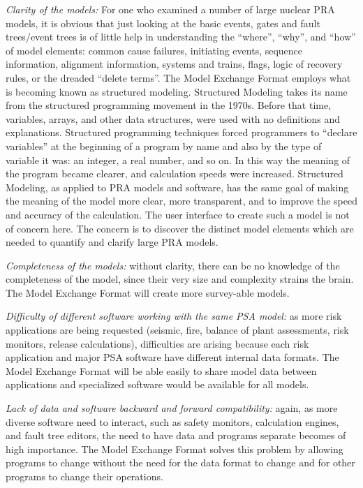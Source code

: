 \documentclass[11pt]{article}
\begin{document}
\emph{Clarity of the models:} For one who examined a number of large nuclear
PRA models, it is obvious that just looking at the basic events, gates
and fault trees/event trees is of little help in understanding the
``where'', ``why'', and ``how'' of model elements: common cause failures,
initiating events, sequence information, alignment information, systems
and trains, flags, logic of recovery rules, or the dreaded ``delete
terms''. The Model Exchange Format employs what is becoming known as
structured modeling. Structured Modeling takes its name from the
structured programming movement in the 1970s. Before that time,
variables, arrays, and other data structures, were used with no
definitions and explanations. Structured programming techniques forced
programmers to ``declare variables'' at the beginning of a program by name
and also by the type of variable it was: an integer, a real number, and
so on. In this way the meaning of the program became clearer, and
calculation speeds were increased. Structured Modeling, as applied to
PRA models and software, has the same goal of making the meaning of the
model more clear, more transparent, and to improve the speed and
accuracy of the calculation. The user interface to create such a model
is not of concern here. The concern is to discover the distinct model
elements which are needed to quantify and clarify large PRA models.

\emph{Completeness of the models:} without clarity, there can be no knowledge
of the completeness of the model, since their very size and complexity
strains the brain. The Model Exchange Format will create more
survey-able models.

\emph{Difficulty of different software working with the same PSA model:} as
more risk applications are being requested (seismic, fire, balance of
plant assessments, risk monitors, release calculations), difficulties
are arising because each risk application and major PSA software have
different internal data formats. The Model Exchange Format will be able
easily to share model data between applications and specialized software
would be available for all models.

\emph{Lack of data and software backward and forward compatibility:} again,
as more diverse software need to interact, such as safety monitors,
calculation engines, and fault tree editors, the need to have data and
programs separate becomes of high importance. The Model Exchange Format
solves this problem by allowing programs to change without the need for
the data format to change and for other programs to change their
operations.
\end{document}
